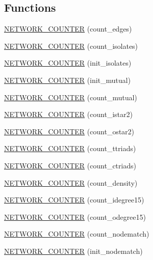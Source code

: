 \subsection*{Functions}
\begin{DoxyCompactItemize}
\item 
\hyperlink{namespacebarry_1_1counters_1_1network_ac6c1b51aacfe3a6c0df270ec606197b6}{N\+E\+T\+W\+O\+R\+K\+\_\+\+C\+O\+U\+N\+T\+ER} (count\+\_\+edges)
\item 
\hyperlink{namespacebarry_1_1counters_1_1network_a2742d688807b24cd1b7edd7c920832d0}{N\+E\+T\+W\+O\+R\+K\+\_\+\+C\+O\+U\+N\+T\+ER} (count\+\_\+isolates)
\item 
\hyperlink{namespacebarry_1_1counters_1_1network_afc3b4dc36d42cb7bc1beb8a09e0a4ec4}{N\+E\+T\+W\+O\+R\+K\+\_\+\+C\+O\+U\+N\+T\+ER} (init\+\_\+isolates)
\item 
\hyperlink{namespacebarry_1_1counters_1_1network_a655f903c09c0a87f10d0c3de28d3223f}{N\+E\+T\+W\+O\+R\+K\+\_\+\+C\+O\+U\+N\+T\+ER} (init\+\_\+mutual)
\item 
\hyperlink{namespacebarry_1_1counters_1_1network_a47fa9fbd75bc098926d9d7ff88736f11}{N\+E\+T\+W\+O\+R\+K\+\_\+\+C\+O\+U\+N\+T\+ER} (count\+\_\+mutual)
\item 
\hyperlink{namespacebarry_1_1counters_1_1network_a16ecffc977756862c833be5ff629d992}{N\+E\+T\+W\+O\+R\+K\+\_\+\+C\+O\+U\+N\+T\+ER} (count\+\_\+istar2)
\item 
\hyperlink{namespacebarry_1_1counters_1_1network_a2a73c4c01b3b383c9379823e12781bf6}{N\+E\+T\+W\+O\+R\+K\+\_\+\+C\+O\+U\+N\+T\+ER} (count\+\_\+ostar2)
\item 
\hyperlink{namespacebarry_1_1counters_1_1network_a1cf95b245bb1893c42c38dccfb917eb3}{N\+E\+T\+W\+O\+R\+K\+\_\+\+C\+O\+U\+N\+T\+ER} (count\+\_\+ttriads)
\item 
\hyperlink{namespacebarry_1_1counters_1_1network_a4512797d0d58449973463006df3799e4}{N\+E\+T\+W\+O\+R\+K\+\_\+\+C\+O\+U\+N\+T\+ER} (count\+\_\+ctriads)
\item 
\hyperlink{namespacebarry_1_1counters_1_1network_aed95675f653398b88e53f9aa72081b75}{N\+E\+T\+W\+O\+R\+K\+\_\+\+C\+O\+U\+N\+T\+ER} (count\+\_\+density)
\item 
\hyperlink{namespacebarry_1_1counters_1_1network_a216a5253d08cf37735bac8ee008cc345}{N\+E\+T\+W\+O\+R\+K\+\_\+\+C\+O\+U\+N\+T\+ER} (count\+\_\+idegree15)
\item 
\hyperlink{namespacebarry_1_1counters_1_1network_a46ec6e9713d19bb70754f270367e228e}{N\+E\+T\+W\+O\+R\+K\+\_\+\+C\+O\+U\+N\+T\+ER} (count\+\_\+odegree15)
\item 
\hyperlink{namespacebarry_1_1counters_1_1network_aefb95d7d5d416a143af04428f84c93c1}{N\+E\+T\+W\+O\+R\+K\+\_\+\+C\+O\+U\+N\+T\+ER} (count\+\_\+nodematch)
\item 
\hyperlink{namespacebarry_1_1counters_1_1network_a80833d4c17d21e071c97f3e09c2ab699}{N\+E\+T\+W\+O\+R\+K\+\_\+\+C\+O\+U\+N\+T\+ER} (init\+\_\+nodematch)
\end{DoxyCompactItemize}
